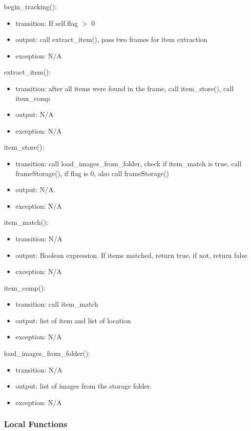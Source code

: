\documentclass[12pt, titlepage]{article}
\begin{document}
\noindent begin\_tracking():
\begin{itemize}
\item transition: If self.flag $>$ 0 
\item output: call extract\_item(), pass two frames for item extraction 
\item exception: N/A
\end{itemize}
\noindent extract\_item():
\begin{itemize}
\item transition: after all items were found in the frame, call item\_store(), call item\_comp
\item output: N/A
\item exception: N/A
\end{itemize}
\noindent item\_store():
\begin{itemize}
\item transition: call load\_images\_from\_folder, check if item\_match is true, call frameStorage(), if flag is 0, also call frameStorage() 
\item output: N/A.
\item exception: N/A
\end{itemize}
\noindent item\_match():
\begin{itemize}
\item transition: N/A
\item output: Boolean expression. If items matched, return true, if not, return false
\item exception: N/A
\end{itemize}
\noindent item\_comp():
\begin{itemize}
\item transition: call item\_match
\item output: list of item and list of location
\item exception: N/A
\end{itemize}
\noindent load\_images\_from\_folder():
\begin{itemize}
\item transition: N/A
\item output: list of images from the storage folder.
\item exception: N/A
\end{itemize}



\subsubsection{Local Functions}
\end{document}
